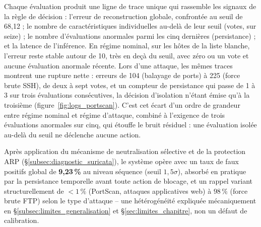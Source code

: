 Chaque évaluation produit une ligne de trace unique qui rassemble les signaux de la règle de décision : l'erreur de reconstruction globale, confrontée au seuil de 68,12 ; le nombre de caractéristiques individuelles au-delà de leur seuil (votes, sur seize) ; le nombre d'évaluations anormales parmi les cinq dernières (persistance) ; et la latence de l'inférence. En régime nominal, sur les hôtes de la liste blanche, l'erreur reste stable autour de 10, très en deçà du seuil, avec zéro ou un vote et aucune évaluation anormale récente. Lors d'une attaque, les mêmes traces montrent une rupture nette : erreurs de 104 (balayage de ports) à 225 (force brute SSH), de deux à sept votes, et un compteur de persistance qui passe de 1 à 3 sur trois évaluations consécutives, la décision d'isolation n'étant émise qu'à la troisième (figure~\ref{fig:logs_portscan}). C'est cet écart d'un ordre de grandeur entre régime nominal et régime d'attaque, combiné à l'exigence de trois évaluations anormales sur cinq, qui étouffe le bruit résiduel : une évaluation isolée au-delà du seuil ne déclenche aucune action.


Après application du mécanisme de neutralisation sélective et de la protection ARP (\S\ref{subsec:diagnostic_suricata}), le système opère avec un taux de faux positifs global de \textbf{9,23\,\%} au niveau séquence (seuil $1,5\sigma$), absorbé en pratique par la persistance temporelle avant toute action de blocage, et un rappel variant structurellement de $<1\,\%$ (PortScan, attaques applicatives web) à $98\,\%$ (force brute FTP) selon le type d'attaque -- une hétérogénéité expliquée mécaniquement en \S\ref{subsec:limites_generalisation} et \S\ref{sec:limites_chapitre}, non un défaut de calibration.

